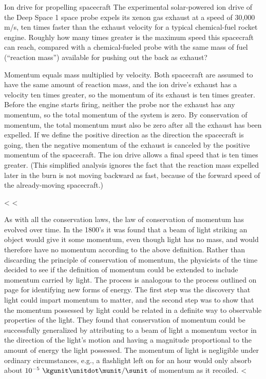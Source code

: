 \begin{eg}{Ion drive for propelling spacecraft}\label{eg:ion-drive}
\egquestion The experimental solar-powered ion drive of the
Deep Space 1 space probe expels its xenon gas exhaust at a
speed of 30,000 m/s, ten times faster than the exhaust
velocity for a typical chem\-ical-fuel rocket engine. Roughly
how many times greater is the maximum speed this spacecraft
can reach, compared with a chem\-ical-fueled probe with the
same mass of fuel (``reaction mass'') available for pushing
out the back as exhaust?

\eganswer Momentum equals mass multiplied by velocity. Both
spacecraft are assumed to have the same amount of reaction
mass, and the ion drive's exhaust has a velocity ten times
greater, so the momentum of its exhaust is ten times
greater. Before the engine starts firing, neither the probe
nor the exhaust has any momentum, so the total momentum of
the system is zero. By conservation of momentum, the total
momentum must also be zero after all the exhaust has been
expelled. If we define the positive direction as the
direction the spacecraft is going, then the negative
momentum of the exhaust is canceled by the positive momentum
of the spacecraft. The ion drive allows a final speed that
is ten times greater. (This simplified analysis ignores the
fact that the reaction mass expelled later in the burn is
not moving backward as fast, because of the forward speed of
the already-moving spacecraft.)
\end{eg}

<%
<%

As with all the conservation laws, the law of conservation
of momentum has evolved over time. In the 1800's it was
found that a beam of light striking an object would give it
some momentum, even though light has no mass, and would
therefore have no momentum according to the above definition.
Rather than discarding the principle of conservation of
momentum, the physicists of the time decided to see if the
definition of momentum could be extended to include momentum
carried by light. The process is analogous to the process
outlined on page
\pageref{subsec:new-forms-of-energy} for identifying new forms of energy.
The first step was the discovery that light could impart
momentum to matter, and the second step was to show that the
momentum possessed by light could be related in a definite
way to observable properties of the light. They found that
conservation of momentum could be successfully generalized
by attributing to a beam of light a momentum vector in the
direction of the light's motion and having a magnitude
proportional to the amount of energy the light possessed.
The momentum of light is negligible
under ordinary circumstances, e.g., a flashlight left on for
an hour would only absorb about $10^{-5}\ \kgunit\unitdot\munit/\sunit$ of
momentum as it recoiled.
<%

